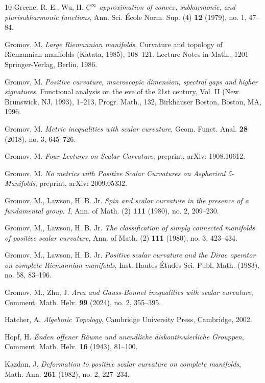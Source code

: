 \documentclass[11pt,letterpaper]{amsart}
\numberwithin{equation}{section}
\theoremstyle{definition}
\begin{document}
\begin{thebibliography}{10}
 Greene, R. E., Wu, H. {{\em $C^\infty$ approximation of convex, subharmonic, and plurisubharmonic functions}, Ann. Sci. \'{E}cole Norm. Sup. (4) {\bf 12} (1979), no. 1, 47--84.}

 Gromov, M. {\em Large Riemannian manifolds}, Curvature and topology of Riemannian manifolds (Katata, 1985), 108--121. Lecture Notes in Math., 1201 Springer-Verlag, Berlin, 1986.

 Gromov, M. {\em Positive curvature, macroscopic dimension, spectral gaps and higher signatures}, Functional analysis on the eve of the 21st century, Vol. II (New Brunswick, NJ, 1993), 1--213, Progr. Math., 132, Birkhäuser Boston, Boston, MA, 1996.

 Gromov, M. {\em Metric inequalities with scalar curvature}, Geom. Funct. Anal. {\bf 28} (2018), no. 3, 645--726.

 Gromov, M. {\em Four Lectures on Scalar Curvature}, preprint, arXiv: 1908.10612.

 Gromov, M. {\em No metrics with Positive Scalar Curvatures on Aspherical 5-Manifolds}, preprint, arXiv: 2009.05332.

 Gromov, M., Lawson, H. B. Jr. {\em Spin and scalar curvature in the presence of a fundamental group. I}, Ann. of Math. (2) {\bf 111} (1980), no. 2, 209--230.

 Gromov, M., Lawson, H. B. Jr. {\em The classification of simply connected manifolds of positive scalar curvature}, Ann. of Math. (2) {\bf 111} (1980), no. 3, 423--434.

 Gromov, M., Lawson, H. B. Jr. {\em Positive scalar curvature and the Dirac operator on complete Riemannian manifolds}, Inst. Hautes \'{E}tudes Sci. Publ. Math. (1983), no. 58, 83--196.

 Gromov, M., Zhu, J. {\em Area and Gauss-Bonnet inequalities with scalar curvature}, {Comment. Math. Helv. {\bf 99} (2024), no. 2, 355--395.}

 Hatcher, A. {\em Algebraic Topology}, Cambridge University Press, Cambridge, 2002.

  Hopf, H. {{\em Enden offener R\"aume und unendliche diskontinuierliche Grouppen}, Comment. Math. Helv. \textbf{16} (1943), 81--100.}

 Kazdan, J. {\em Deformation to positive scalar curvature on complete manifolds}, Math. Ann. \textbf{261} (1982), no. 2, 227--234.


\end{thebibliography}
\end{document}
